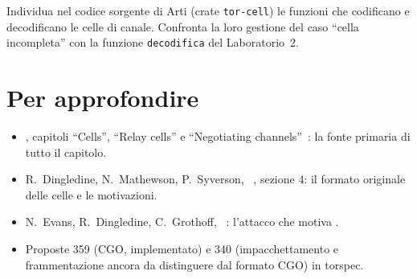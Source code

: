 \begin{esercizio}[3]\label{es:08-arti}
Individua nel codice sorgente di Arti (crate \texttt{tor-cell}) le funzioni che codificano e decodificano le celle di canale. Confronta la loro gestione del caso \enquote{cella incompleta} con la funzione \texttt{decodifica} del Laboratorio~2.
\end{esercizio}

\section*{Per approfondire}
\begin{itemize}
  \item {}, capitoli \enquote{Cells}, \enquote{Relay cells} e \enquote{Negotiating channels}~\cite{torspec}: la fonte primaria di tutto il capitolo.
  \item R.~Dingledine, N.~Mathewson, P.~Syverson, ~\cite{dingledine2004tor}, sezione 4: il formato originale delle celle e le motivazioni.
  \item N.~Evans, R.~Dingledine, C.~Grothoff, ~\cite{evans2009congestion}: l'attacco che motiva .
  \item Proposte 359 (CGO, implementato) e 340 (impacchettamento e frammentazione ancora da distinguere dal formato CGO) in torspec.
\end{itemize}
